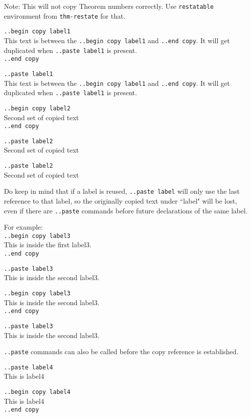 \documentclass[12pt]{article}
\newcommand{\nl}{\\}
\numberwithin{equation}{section}
\begin{document}
\begin{flushleft}

Note: This will not copy Theorem numbers correctly. Use \verb|restatable| environment from \verb|thm-restate| for that.

\bigskip

\verb|..begin copy label1| \nl
This text is between the \verb|..begin copy label1| and \verb|..end copy|. It will get duplicated when \verb|..paste label1| is present. \nl
\verb|..end copy|

\bigskip

\verb|..paste label1| \nl
This text is between the \verb|..begin copy label1| and \verb|..end copy|. It will get duplicated when \verb|..paste label1| is present. \nl

\bigskip

\verb|..begin copy label2| \nl
Second set of copied text \nl
\verb|..end copy|

\bigskip

\verb|..paste label2| \nl
Second set of copied text \nl

\medskip

\verb|..paste label2| \nl
Second set of copied text \nl

\bigskip

Do keep in mind that if a label is reused, \verb|..paste label| will only use the last reference to that label, so the originally copied text under ``label" will be lost, even if there are \verb|..paste| commands before future declarations of the same label.

\bigskip

For example: \nl
\verb|..begin copy label3|\nl
This is inside the first label3. \nl
\verb|..end copy|

\bigskip

\verb|..paste label3| \nl
This is inside the second label3. \nl

\bigskip

\verb|..begin copy label3|\nl
This is inside the second label3. \nl
\verb|..end copy|

\bigskip

\verb|..paste label3| \nl
This is inside the second label3. \nl

\bigskip

\verb|..paste| commands can also be called before the copy reference is established.

\verb|..paste label4| \nl
This is label4 \nl

\bigskip

\verb|..begin copy label4| \nl
This is label4 \nl
\verb|..end copy|

\end{flushleft}
\end{document}
